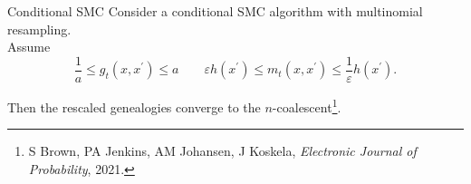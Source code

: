 \documentclass[aspectratio=169]{beamer}
\theoremstyle{definition}
\begin{document}
\begin{frame}{Conditional SMC}
Consider a conditional SMC algorithm with multinomial resampling.\\[10pt]
\pause
Assume
\begin{equation*}
\frac{1}{a} \leq g_t(x, x^\prime) \leq a \qquad
\varepsilon h(x^\prime) \leq m_t(x, x^\prime) \leq \frac{1}{\varepsilon} h(x^\prime) .
\end{equation*}

\pause
Then the rescaled genealogies converge to the $n$-coalescent\footnote{S Brown, PA Jenkins, AM Johansen, J Koskela,  \textit{Electronic Journal of Probability}, 2021.}.
\end{frame}
\end{document}
